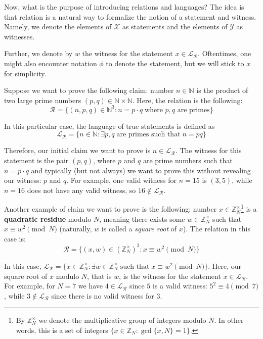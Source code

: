 \documentclass[../lecture-notes-148x210.tex]{subfiles}
\begin{document}
Now, what is the purpose of introducing relations and languages? The idea is that relation is a natural way to formalize the notion of a statement and witness. Namely, we denote the elements of $\mathcal{X}$ as statements and the elements of $\mathcal{Y}$ as witnesses.

Further, we denote by $w$ the witness for the statement $x \in \mathcal{L}_{\mathcal{R}}$. Oftentimes, one might also encounter notation $\phi$ to denote the statement, but we will stick to $x$ for simplicity.

\begin{example}
    Suppose we want to prove the following claim: number $n \in \mathbb{N}$ is the product of two large prime numbers $(p,q) \in \mathbb{N} \times \mathbb{N}$. Here, the relation is the following:
    \begin{equation*}
        \mathcal{R} = \{ (n, p, q) \in \mathbb{N}^3: n = p \cdot q \; \text{where $p,q$ are primes} \}
    \end{equation*}

    In this particular case, the language of true statements is defined as 
    \begin{equation*}
        \mathcal{L}_{\mathcal{R}} = \{n \in \mathbb{N}: \exists p,q \; \text{are primes such that}\; n = pq\}
    \end{equation*}
    
    Therefore, our initial claim we want to prove is $n \in \mathcal{L}_{\mathcal{R}}$. The witness for this statement is the pair $(p,q)$, where $p$ and $q$ are prime numbers such that $n = p \cdot q$ and typically (but not always) we want to prove this without revealing our witness: $p$ and $q$. For example, one valid witness for $n = 15$ is $(3,5)$, while $n=16$ does not have any valid witness, so $16 \not\in \mathcal{L}_{\mathcal{R}}$.
\end{example}

\begin{example}
    Another example of claim we want to prove is the following: number $x \in \mathbb{Z}_N^{\times}$\footnote{By $\mathbb{Z}_N^{\times}$ we denote the multiplicative group of integers modulo $N$. In other words, this is a set of integers $\{x \in \mathbb{Z}_N: \gcd \{x, N\} = 1\}$.} is a \textbf{quadratic residue} modulo $N$, meaning there exists some $w \in \mathbb{Z}_N^{\times}$ such that $x \equiv w^2 \pmod{N}$ (naturally, $w$ is called a \textit{square root} of $x$). The relation in this case is:
    \begin{equation*}
        \mathcal{R} = \{ (x, w) \in (\mathbb{Z}_N^{\times})^2: x \equiv w^2 \pmod{N} \}
    \end{equation*}

    In this case, $\mathcal{L}_{\mathcal{R}} = \{x \in \mathbb{Z}_N^{\times}: \exists w \in \mathbb{Z}_N^{\times} \; \text{such that} \; x \equiv w^2 \pmod{N}\}$. Here, our square root of $x$ modulo $N$, that is $w$, is the witness for the statement $x \in \mathcal{L}_{\mathcal{R}}$. For example, for $N=7$ we have $4 \in \mathcal{L}_{\mathcal{R}}$ since $5$ is a valid witness: $5^2 \equiv 4 \pmod{7}$, while $3 \not\in \mathcal{L}_{\mathcal{R}}$ since there is no valid witness for $3$.
\end{example}
\end{document}
